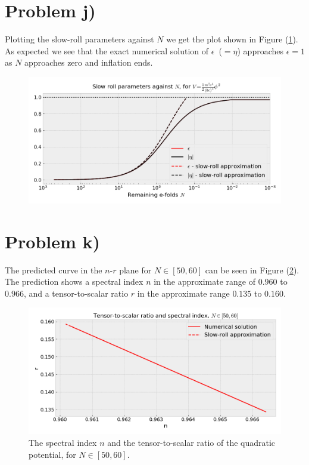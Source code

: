 \documentclass[reprint,english,notitlepage]{revtex4-1}  %
\numberwithin{equation}{section}
\begin{document}
\section{Problem j)}
Plotting the slow-roll parameters against $N$ we get the plot shown in Figure
(\ref{fig:quadratic_slowroll-N}). As expected we see that the exact numerical
solution of $\epsilon$ ($=\eta$) approaches $\epsilon=1$ as $N$ approaches zero
and inflation ends.
\begin{figure}[h!]
	\includegraphics[width=\linewidth]{QuadraticPotential_slowroll-N.png}
	\caption{}
	\label{fig:quadratic_slowroll-N}
\end{figure}

\section{Problem k)}
The predicted curve in the $n$-$r$ plane for
$N\in[50,60]$ can be seen in Figure (\ref{fig:quadratic_slowroll-nr}).
The prediction shows a spectral index $n$ in the approximate range of $0.960$ to
$0.966$, and a tensor-to-scalar ratio $r$ in the approximate range
$0.135$ to $0.160$.
\begin{figure}[h!]
	\includegraphics[width=\linewidth]{QuadraticPotential_slowroll-nr.png}
	\caption{The spectral index $n$ and the tensor-to-scalar ratio of the
	quadratic potential, for $N\in[50,60]$.}
	\label{fig:quadratic_slowroll-nr}
\end{figure}
\end{document}
